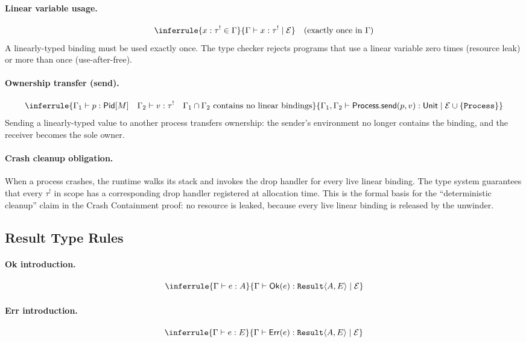 \documentclass[11pt,twocolumn]{article}
\newcommand{\Result}{\texttt{Result}}
\newcommand{\Eff}{\mathcal{E}}
\newcommand{\OK}{\ensuremath{\mathsf{Ok}}}
\newcommand{\Err}{\ensuremath{\mathsf{Err}}}
\begin{document}
\paragraph{Linear variable usage.}
\[
  \inferrule
    {x : \tau^{!} \in \Gamma}
    {\Gamma \vdash x : \tau^{!} \mid \Eff}
    \quad\text{(exactly once in } \Gamma\text{)}
\]
A linearly-typed binding must be used exactly once. The type checker rejects programs that use a linear variable zero times (resource leak) or more than once (use-after-free).

\paragraph{Ownership transfer (send).}
\[
  \inferrule
    {\Gamma_1 \vdash p : \mathsf{Pid}[M] \quad \Gamma_2 \vdash v : \tau^{!} \quad \Gamma_1 \cap \Gamma_2 \text{ contains no linear bindings}}
    {\Gamma_1, \Gamma_2 \vdash \mathsf{Process.send}(p, v) : \mathsf{Unit} \mid \Eff \cup \{\texttt{Process}\}}
\]
Sending a linearly-typed value to another process transfers ownership: the sender's environment no longer contains the binding, and the receiver becomes the sole owner.

\paragraph{Crash cleanup obligation.}
When a process crashes, the runtime walks its stack and invokes the drop handler for every live linear binding. The type system guarantees that every $\tau^{!}$ in scope has a corresponding drop handler registered at allocation time. This is the formal basis for the ``deterministic cleanup'' claim in the Crash Containment proof: no resource is leaked, because every live linear binding is released by the unwinder.

\subsection{Result Type Rules}

\paragraph{Ok introduction.}
\[
  \inferrule
    {\Gamma \vdash e : A}
    {\Gamma \vdash \OK(e) : \Result\langle A, E\rangle \mid \Eff}
\]

\paragraph{Err introduction.}
\[
  \inferrule
    {\Gamma \vdash e : E}
    {\Gamma \vdash \Err(e) : \Result\langle A, E\rangle \mid \Eff}
\]
\end{document}
